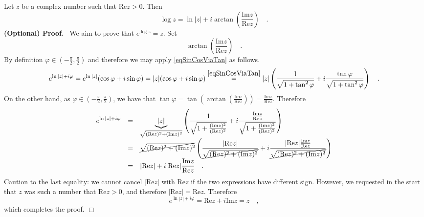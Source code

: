 \documentclass[12pt]{book}
\renewcommand{\Im}{\mathrm{Im}}
\renewcommand{\Re}{\mathrm{Re}}
\newcommand{\importantFormula}[1]{\begin{equation} \boxed{#1} \end{equation}}
\newenvironment{proofOptional}[1][]{ \noindent \textbf{(Optional) Proof#1.}}{$\Box$\medskip}
\begin{document}
Let $z$ be a complex number such that $\Re z>0$. Then
\importantFormula{
\log z = \ln |z| + i\arctan \left(\frac{\Im z}{\Re z}\right)\quad .
}
\begin{proofOptional} 
~We aim to prove that $e^{\log z}=z$. Set 
\[
\arctan \left(\frac{\Im z}{\Re z}\right)\quad .
\]
By definition $\varphi\in  (-\frac{\pi}{2}, \frac{\pi}{2})$ and therefore we may apply \eqref{eqSinCosViaTan} as follows.
\[
e^{\ln |z| + i\varphi}= e^{\ln |z|} (\cos\varphi+i\sin\varphi )=|z|(\cos\varphi+i\sin\varphi ) \stackrel{\eqref{eqSinCosViaTan}}{=} 
|z| \left(\frac{1}{\sqrt{1+\tan^2\varphi}} +i \frac{\tan \varphi}{\sqrt{1+\tan^2\varphi}} \right)\quad .
\]
On the other hand, as $\varphi\in  (-\frac{\pi}{2}, \frac{\pi}{2})$, we have that $\tan\varphi= \tan\left(\arctan\left(\frac{\Im z}{\Re z}\right)\right)= \frac{\Im z}{\Re z}$. Therefore
\[
\begin{array}{rcl}
\displaystyle e^{\ln |z| + i\varphi}&=&\displaystyle \underbrace{|z|}_{\sqrt{(\Re z)^2+(\Im z)^2}} \left(\frac{1}{\sqrt{1+\frac{(\Im z)^2}{(\Re z)^2}}} +i \frac{\frac{\Im z}{\Re z}}{\sqrt{1+\frac{(\Im z)^2}{(\Re z)^2}}} \right) \\
&=&\displaystyle \cancel{\sqrt{(\Re z)^2+(\Im z)^2}} \left(\frac{|\Re z|}{\cancel{\sqrt{(\Re z)^2+(\Im z)^2}}} +i \frac{|\Re z|\frac{\Im z}{\Re z}}{\cancel{\sqrt{(\Re z)^2+(\Im z)^2}}} \right) \\
&=&\displaystyle|\Re z | + i|\Re z| \frac{\Im z}{\Re z}\quad .
\end{array}
\]
Caution to the last equality: we cannot cancel $|\Re z| $ with $\Re z$ if the two expressions have different sign. However, we requested in the start that $z$ was such a number that $\Re z>0$, and therefore $|\Re z|=\Re z $. Therefore 
\[
e^{\ln |z| + i\varphi}=\Re z+i\Im z = z\quad ,
\]
which completes the proof.
\end{proofOptional}
\end{document}
